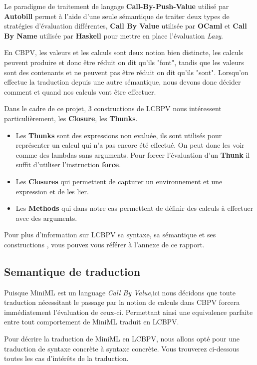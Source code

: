 \documentclass[12pt]{article}
\begin{document}
Le paradigme de traitement de langage \textbf{Call-By-Push-Value}
utilisé par \textbf{Autobill} permet à l'aide d'une seule sémantique de
traiter deux types de stratégies d'évaluation différentes, \textbf{Call
      By Value} utilisée par \textbf{OCaml} et \textbf{Call By Name} utilisée
par \textbf{Haskell} pour mettre en place l'évaluation \emph{Lazy}.

En CBPV, les valeurs et les calculs sont deux notion bien distincte, les calculs peuvent produire et donc être réduit on dit qu'ils "font",
tandis que les valeurs sont des contenants et ne peuvent pas être réduit on dit qu'ils "sont".
Lorsqu'on effectue la traduction depuis une autre sémantique, nous devons donc décider comment et quand nos calculs vont être effectuer.

Dans le cadre de ce projet, 3 constructions de LCBPV nous intéressent particulièrement, les \textbf{Closure}, les \textbf{Thunks}.
\begin{itemize}
      \item
            Les \textbf{Thunks} sont des expressions non evaluée, ils sont utilisés pour représenter un calcul qui n'a pas encore été effectué.
            On peut donc les voir comme des lambdas sans arguments.
            Pour forcer l'évaluation d'un \textbf{Thunk} il suffit d'utiliser l'instruction  \textbf{force}.
      \item
            Les \textbf{Closures} qui permettent de capturer un environnement et une expression et de les lier.
      \item
            Les \textbf{Methods} qui dans notre cas permettent de définir des calculs à effectuer avec des arguments.
\end{itemize}
Pour plus d'information sur LCBPV sa syntaxe, sa sémantique et ses constructions , vous pouvez vous référer à l'annexe de ce rapport.

\hypertarget{semantique-de-traduction}{%
      \subsection{Semantique de traduction}\label{semantique-de-traduction}}

Puisque MiniML est un language \emph{Call By Value},ici nous décidons que toute traduction nécessitant le passage par la notion de calculs dans CBPV forcera immédiatement l'évaluation de ceux-ci.
Permettant ainsi une equivalence parfaite entre tout comportement de MiniML traduit en LCBPV.

Pour décrire la traduction de MiniML en LCBPV, nous allons opté pour une traduction de syntaxe concrète à syntaxe concrète.
Vous trouverez ci-dessous toutes les cas d'intérêts de la traduction.
\end{document}

